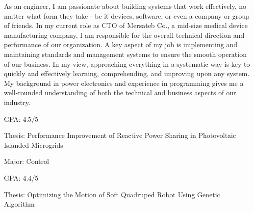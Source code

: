 \documentclass[10pt,a4paper,ragged2e,withhyper]{altacv}
\begin{document}

\makecvheader



\begin{paracol}{2}

{\justifying \noindent As an engineer, I am passionate about building systems that work effectively, no matter what form they take - be it devices, software, or even a company or group of friends. In my current role as CTO of Mersateb Co., a mid-size medical device manufacturing company, I am responsible for the overall technical direction and performance of our organization. A key aspect of my job is implementing and maintaining standards and management systems to ensure the smooth operation of our business. In my view, approaching everything in a systematic way is key to quickly and effectively learning, comprehending, and improving upon any system. My background in power electronics and experience in programming gives me a well-rounded understanding of both the technical and business aspects of our industry. \par}

GPA: 4.5/5 \par
Thesis: Performance Improvement of Reactive Power Sharing in Photovoltaic Islanded Microgrids

\divider
{}
Major: Control \par
GPA: 4.4/5 \par
Thesis: Optimizing the Motion of Soft Quadruped Robot Using Genetic Algorithm





\end{paracol}
\end{document}
